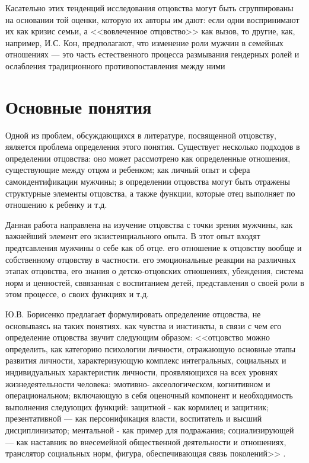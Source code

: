 \documentclass{../../common/thesisbyxetex}
\begin{document}
Касательно этих тенденций исследования отцовства могут быть сгруппированы на основании той оценки,
которую их авторы им дают: если одни воспринимают их как кризис семьи, а <<вовлеченное отцовство>>
как вызов, то другие, как, например, И.С. Кон, предполагают, что изменение роли мужчин в семейных
отношениях --- это часть естественного процесса размывания гендерных ролей и ослабления
традиционного противопоставления между ними \cite{konmen}

\section{Основные понятия}

Одной из проблем, обсуждающихся в литературе, посвященной отцовству, яяляется проблема определения
этого понятия. Существует несколько подходов в определении отцовства: оно может рассмотрено как
определенные отношения, существующие между отцом и ребенком; как личный опыт и сфера
самоидентификации мужчины; в определении отцовства могут быть отражены структурные элементы
отцовства, а также функции, которые отец выполняет по отношению к ребенку и т.д.

Данная работа направлена на изучение отцовства с точки зрения мужчины, как важнейший элемент его
экзистенциального опыта. В этот опыт входят предтсавления мужчины о себе как об отце.
его отношение к отцовству вообще и собственному отцовству в частности. его
эмоциональные реакции на различных этапах отцовства, его знания о детско-отцовских
отношениях, убеждения, система норм и ценностей, сввязанная с воспитанием детей,
представления о своей роли в этом процессе, о своих функциях и т.д.

Ю.В. Борисенко предлагает формулировать определение отцовства, не основываясь на таких понятиях.
как чувства и инстинкты, в связи с чем его определение отцовства звучит следующим образом:
<<отцовство можно определить, как категорию психологии
личности, отражающую основные этапы развития личности, характеризующую
комплекс интегральных, социальных и индивидуальных характеристик личности,
проявляющихся на всех уровнях жизнедеятельности человека: эмотивно-
аксеологическом, когнитивном и операциональном; включающую в себя оценочный
компонент и необходимость выполнения следующих функций: защитной - как
кормилец и защитник; презентативной — как персонификация власти, воспитатель
и высший дисциплинизатор; ментальной - как пример для подражания;
социализирующей — как наставник во внесемейной общественной деятельности и
отношениях, транслятор социальных норм, фигура, обеспечивающая связь
поколений>> \cite[48]{psyot}.
\end{document}
